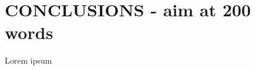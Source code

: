 \documentclass[letterpaper, 10 pt, conference]{ieeeconf}  %
\begin{document}
\section{CONCLUSIONS - aim at 200 words}

Lorem ipsum\cite{gunasekaran2011evaluation}

\addtolength{\textheight}{-12cm}   %










\end{document}
